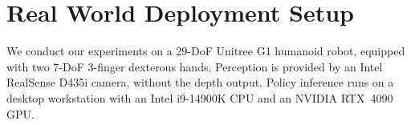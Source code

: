  
\section{Real World Deployment Setup}
\label{app:deploy}

We conduct our experiments on a 29-DoF Unitree G1 humanoid robot, equipped with two 7-DoF 3-finger dexterous hands. Perception is provided by an Intel RealSense D435i camera, without the depth output. Policy inference runs on a desktop workstation with an Intel i9-14900K CPU and an NVIDIA RTX~4090 GPU.